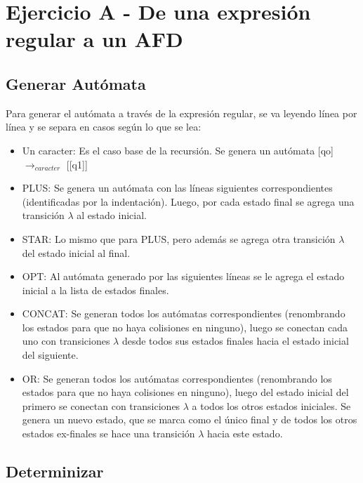 \section{Ejercicio A - De una expresión regular a un AFD}

\subsection{Generar Autómata}
Para generar el autómata a través de la expresión regular, se va leyendo línea por línea y se separa en casos según lo que se lea:

\begin{itemize}

\item Un caracter: Es el caso base de la recursión. Se genera un autómata [qo] $\rightarrow_{caracter}$ [[q1]]

\item PLUS: Se genera un autómata con las líneas siguientes correspondientes (identificadas por la indentación). Luego, por cada estado final se agrega una transición $\lambda$ al estado inicial.

\item STAR: Lo mismo que para PLUS, pero además se agrega otra transición $\lambda$ del estado inicial al final.

\item OPT: Al autómata generado por las siguientes líneas se le agrega el estado inicial a la lista de estados finales.

\item CONCAT: Se generan todos los autómatas correspondientes (renombrando los estados para que no haya colisiones en ninguno), luego se conectan cada uno con transiciones $\lambda$ desde todos sus estados finales hacia el estado inicial del siguiente.

\item OR: Se generan todos los autómatas correspondientes (renombrando los estados para que no haya colisiones en ninguno), luego del estado inicial del primero se conectan con transiciones $\lambda$ a todos los otros estados iniciales. Se genera un nuevo estado, que se marca como el único final y de todos los otros estados ex-finales se hace una transición $\lambda$ hacia este estado.

\end{itemize}

\subsection{Determinizar}

